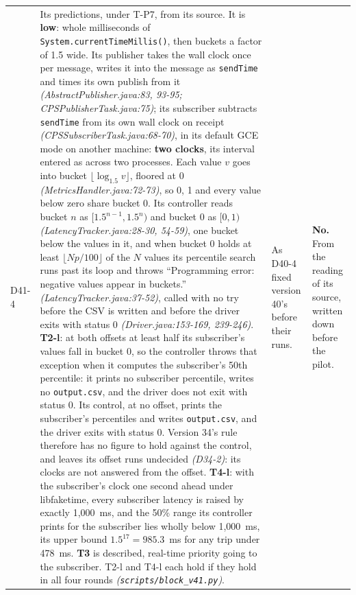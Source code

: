 \documentclass[11pt]{article}
\newcommand{\gl}[1]{{\color{soft}\itshape\small (#1)}}
\begin{document}
{\begin{longtable}{@{}p{1.1cm} >{\raggedright\arraybackslash}p{6.1cm} >{\raggedright\arraybackslash}p{6.0cm} >{\raggedright\arraybackslash}p{2.2cm}@{}}
D41-4 & Its predictions, under T-P7, from its source. It is \textbf{low}: whole milliseconds of \texttt{System.currentTimeMillis()}, then buckets a factor of 1.5 wide. Its publisher takes the wall clock once per message, writes it into the message as \texttt{sendTime} and times its own publish from it \gl{AbstractPublisher.java:83, 93-95; CPSPublisherTask.java:75}; its subscriber subtracts \texttt{sendTime} from its own wall clock on receipt \gl{CPSSubscriberTask.java:68-70}, in its default GCE mode on another machine: \textbf{two clocks}, its interval entered as across two processes. Each value $v$ goes into bucket $\lfloor\log_{1.5} v\rfloor$, floored at 0 \gl{MetricsHandler.java:72-73}, so 0, 1 and every value below zero share bucket 0. Its controller reads bucket $n$ as $[1.5^{n-1}, 1.5^{n})$ and bucket 0 as $[0, 1)$ \gl{LatencyTracker.java:28-30, 54-59}, one bucket below the values in it, and when bucket 0 holds at least $\lfloor Np/100\rfloor$ of the $N$ values its percentile search runs past its loop and throws ``Programming error: negative values appear in buckets.'' \gl{LatencyTracker.java:37-52}, called with no try before the CSV is written and before the driver exits with status 0 \gl{Driver.java:153-169, 239-246}. \textbf{T2-l}: at both offsets at least half its subscriber's values fall in bucket 0, so the controller throws that exception when it computes the subscriber's 50th percentile: it prints no subscriber percentile, writes no \texttt{output.csv}, and the driver does not exit with status 0. Its control, at no offset, prints the subscriber's percentiles and writes \texttt{output.csv}, and the driver exits with status 0. Version 34's rule therefore has no figure to hold against the control, and leaves its offset runs undecided \gl{D34-2}: its clocks are not answered from the offset. \textbf{T4-l}: with the subscriber's clock one second ahead under libfaketime, every subscriber latency is raised by exactly 1,000~ms, and the 50\% range its controller prints for the subscriber lies wholly below 1,000~ms, its upper bound $1.5^{17} = 985.3$~ms for any trip under 478~ms. \textbf{T3} is described, real-time priority going to the subscriber. T2-l and T4-l each hold if they hold in all four rounds \gl{\texttt{scripts/block\_v41.py}}. & As D40-4 fixed version 40's before their runs. & \textbf{No.} From the reading of its source, written down before the pilot. \\

\end{longtable}}
\end{document}
